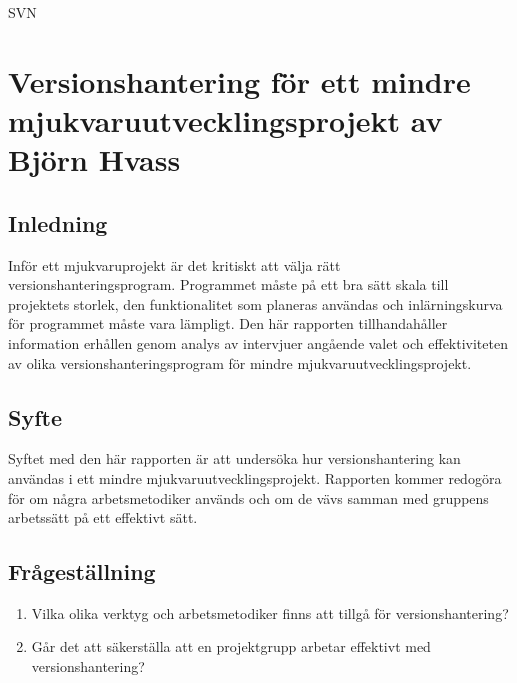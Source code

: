 SVN

\chapter{Versionshantering för ett mindre mjukvaruutvecklingsprojekt av Björn Hvass}

\section{Inledning}
Inför ett mjukvaruprojekt är det kritiskt att välja rätt versionshanteringsprogram. Programmet måste på ett bra sätt skala till projektets storlek, den funktionalitet som planeras användas och inlärningskurva för programmet måste vara lämpligt. Den här rapporten tillhandahåller information erhållen genom analys av intervjuer angående valet och effektiviteten av olika versionshanteringsprogram för mindre mjukvaruutvecklingsprojekt.

\section{Syfte}
Syftet med den här rapporten är att undersöka hur versionshantering kan användas i ett mindre mjukvaruutvecklingsprojekt. Rapporten kommer redogöra för om några arbetsmetodiker används och om de vävs samman med gruppens arbetssätt på ett effektivt sätt.

\section{Frågeställning}
\begin{enumerate}
    \item Vilka olika verktyg och arbetsmetodiker finns att tillgå för versionshantering?
    \item Går det att säkerställa att en projektgrupp arbetar effektivt med versionshantering?
\end{enumerate}

